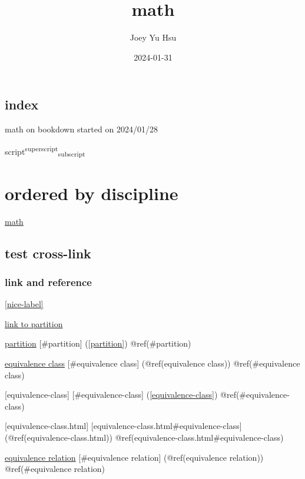 \documentclass[
]{book}
\title{math}
\author{Joey Yu Hsu}
\date{2024-01-31}
\theoremstyle{definition}
\theoremstyle{definition}
\theoremstyle{definition}
\theoremstyle{definition}
\theoremstyle{remark}
\begin{document}
\maketitle

{
\hypersetup{linkcolor=}
\setcounter{tocdepth}{1}
\tableofcontents
}
\hypertarget{index}{%
\chapter*{index}\label{index}}

math on bookdown started on 2024/01/28

script\textsuperscript{superscript}\textsubscript{subscript}

\hypertarget{part-ordered-by-discipline}{%
\part{ordered by discipline}\label{part-ordered-by-discipline}}

\protect\hyperlink{nice-label}{math}

\hypertarget{test-cross-link}{%
\chapter{test cross-link}\label{test-cross-link}}

\hypertarget{link-and-reference}{%
\section{link and reference}\label{link-and-reference}}

\ref{nice-label}

\protect\hyperlink{partition}{link to partition}

\protect\hyperlink{partition}{partition} {[}\#partition{]} (\ref{partition}) @ref(\#partition)

\protect\hyperlink{equivalence-class}{equivalence class} {[}\#equivalence class{]} (@ref(equivalence class)) @ref(\#equivalence class)

{[}equivalence-class{]} {[}\#equivalence-class{]} (\ref{equivalence-class}) @ref(\#equivalence-class)

{[}equivalence-class.html{]} {[}equivalence-class.html\#equivalence-class{]} (@ref(equivalence-class.html)) @ref(equivalence-class.html\#equivalence-class)

\protect\hyperlink{equivalence-relation}{equivalence relation} {[}\#equivalence relation{]} (@ref(equivalence relation)) @ref(\#equivalence relation)
\end{document}

